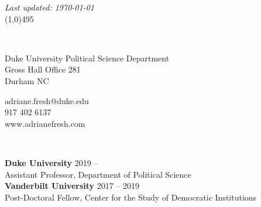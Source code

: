 \documentclass[11pt]{article}
\begin{document}
\singlespacing
\setlength{\parindent}{0in}
\setlength{\parskip}{0in}


\thispagestyle{empty}





\noindent \LARGE{\textbf{}}  \hfill   \small \emph{Last updated: \today} \vspace*{-.1in} \\

\vspace{-.15in}
\line(1,0){495}









\vspace{0.2in}
\normalsize


\begin{minipage}[t]{.22\textwidth}
	 \\
\end{minipage}
\begin{minipage}[t]{.47\textwidth}
	Duke University Political Science Department \\
	Gross Hall Office 281 \\
	Durham NC  \\
\end{minipage}
\begin{minipage}[t]{.25\textwidth}
	adriane.fresh@duke.edu \\
	917 402 6137 \\
	www.adrianefresh.com \\
\end{minipage}






\vspace{.2in}
\begin{minipage}[t]{.21\textwidth}
	 \\
\end{minipage}
\begin{minipage}[t]{.79\textwidth}
	\textbf{Duke University}  \hfill 2019 -- \hspace*{.3in} \\
	\hspace*{.15in}Assistant Professor, Department of Political Science  \\

	\textbf{Vanderbilt University}  \hfill 2017 -- 2019 \\
	\hspace*{.15in}Post-Doctoral Fellow, Center for the Study of Democratic Institutions  \\
\end{minipage}
\end{document}
